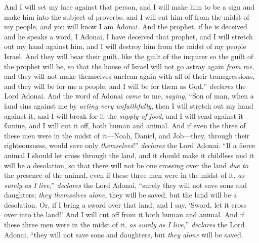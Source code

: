 \begin{biblechapter}
\verse And I will set my face against that person, and I will make him to be a sign and make him into the subject of proverbs; and I will cut him off from the midst of my people, and you will know I am Adonai.
\verse And the prophet, if he is deceived and he speaks a word, I Adonai, I have deceived that prophet, and I will stretch out my hand against him, and I will destroy him from the midst of my people Israel.
\verse And they will bear their guilt, like the guilt of the inquirer so the guilt of the prophet will be,
\verse so that the house of Israel will not go astray again \textit{from me}, and they will not make themselves unclean again with all of their transgressions, and they will be for me a people, and I will be for them as God,” \textit{declares} the Lord Adonai.
 And the word of Adonai \textit{came} to me, \textit{saying},
\verse “Son of man, when a land sins against me by \textit{acting very unfaithfully}, then I will stretch out my hand against it, and I will break for it the \textit{supply of food}, and I will send against it famine, and I will cut it off, both human and animal.
\verse And if even the three of these men were in the midst of it—Noah, Daniel, and Job—they, through their righteousness, would save only \textit{themselves}!” \textit{declares} the Lord Adonai.
\verse “If a fierce animal I should let cross through the land, and it should make it childless and it will be a desolation, so that there will not be one crossing over the land \textit{due to} the presence of the animal,
\verse even if these three men were in the midst of it, \textit{as surely as I live},” \textit{declares} the Lord Adonai, “surely they will not save sons and daughters; \textit{they themselves alone}, they will be saved, but the land will be a desolation.
\verse Or, if I bring a sword over that land, and I say, ‘Sword, let it cross over into the land!’ And I will cut off from it both human and animal.
\verse And if these three men were in the midst of it, \textit{as surely as I live},” \textit{declares} the Lord Adonai, “they will not save sons and daughters, but \textit{they alone} will be saved.

\end{biblechapter}
